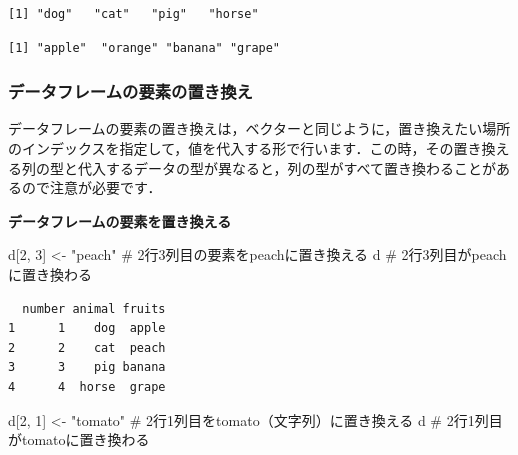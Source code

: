 \documentclass[
  letterpaper,
  DIV=11,
  numbers=noendperiod]{scrreprt}
\newenvironment{Shaded}{\begin{snugshade}}{\end{snugshade}}
\newcommand{\CommentTok}[1]{\textcolor[rgb]{0.37,0.37,0.37}{#1}}
\newcommand{\DecValTok}[1]{\textcolor[rgb]{0.68,0.00,0.00}{#1}}
\newcommand{\NormalTok}[1]{\textcolor[rgb]{0.00,0.23,0.31}{#1}}
\newcommand{\OtherTok}[1]{\textcolor[rgb]{0.00,0.23,0.31}{#1}}
\newcommand{\SpecialCharTok}[1]{\textcolor[rgb]{0.37,0.37,0.37}{#1}}
\newcommand{\StringTok}[1]{\textcolor[rgb]{0.13,0.47,0.30}{#1}}
\begin{document}
\begin{verbatim}
[1] "dog"   "cat"   "pig"   "horse"
\end{verbatim}

\begin{Shaded}
\end{Shaded}

\begin{verbatim}
[1] "apple"  "orange" "banana" "grape" 
\end{verbatim}

\hypertarget{ux30c7ux30fcux30bfux30d5ux30ecux30fcux30e0ux306eux8981ux7d20ux306eux7f6eux304dux63dbux3048}{%
\subsubsection{データフレームの要素の置き換え}\label{ux30c7ux30fcux30bfux30d5ux30ecux30fcux30e0ux306eux8981ux7d20ux306eux7f6eux304dux63dbux3048}}

データフレームの要素の置き換えは，ベクターと同じように，置き換えたい場所のインデックスを指定して，値を代入する形で行います．この時，その置き換える列の型と代入するデータの型が異なると，列の型がすべて置き換わることがあるので注意が必要です．

\textbf{データフレームの要素を置き換える}

\begin{Shaded}
\begin{Highlighting}[]
\NormalTok{d[}\DecValTok{2}\NormalTok{, }\DecValTok{3}\NormalTok{] }\OtherTok{\textless{}{-}} \StringTok{"peach"} \CommentTok{\# 2行3列目の要素をpeachに置き換える}
\NormalTok{d }\CommentTok{\# 2行3列目がpeachに置き換わる}
\end{Highlighting}
\end{Shaded}

\begin{verbatim}
  number animal fruits
1      1    dog  apple
2      2    cat  peach
3      3    pig banana
4      4  horse  grape
\end{verbatim}

\begin{Shaded}
\begin{Highlighting}[]
\NormalTok{d[}\DecValTok{2}\NormalTok{, }\DecValTok{1}\NormalTok{] }\OtherTok{\textless{}{-}} \StringTok{"tomato"} \CommentTok{\# 2行1列目をtomato（文字列）に置き換える}
\NormalTok{d }\CommentTok{\# 2行1列目がtomatoに置き換わる}
\end{Highlighting}
\end{Shaded}
\end{document}
